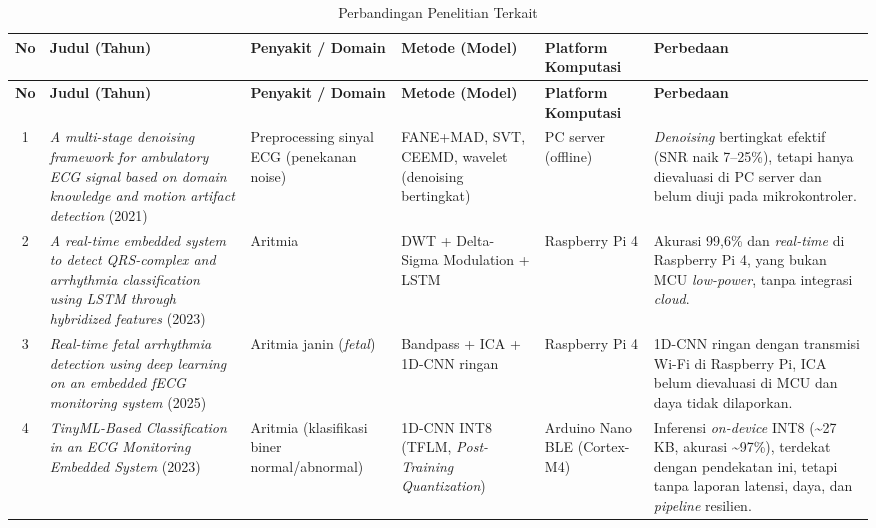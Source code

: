 {\scriptsize
\setlength{\tabcolsep}{3pt}
\renewcommand{\arraystretch}{1.2}
\begin{longtable}{|c|L{3.5cm}|L{2.0cm}|L{2.0cm}|L{1.8cm}|L{2.8cm}|}
\caption{Perbandingan Penelitian Terkait}\label{tab:perbandingan-penelitian}\\
\hline
\textbf{No} & \textbf{Judul (Tahun)} & \textbf{Penyakit / Domain} & \textbf{Metode (Model)} & \textbf{Platform Komputasi} & \textbf{Perbedaan} \\ \hline
\endfirsthead
\hline
\textbf{No} & \textbf{Judul (Tahun)} & \textbf{Penyakit / Domain} & \textbf{Metode (Model)} & \textbf{Platform Komputasi} & \textbf{Perbedaan} \\ \hline
\endhead
\endfoot
\endlastfoot

1 & \textit{A multi-stage denoising framework for ambulatory ECG signal based on domain knowledge and motion artifact detection} (2021) & Preprocessing sinyal ECG (penekanan noise) & FANE+MAD, SVT, CEEMD, wavelet (denoising bertingkat) & PC server (offline) & \textit{Denoising} bertingkat efektif (SNR naik 7--25\%), tetapi hanya dievaluasi di PC server dan belum diuji pada mikrokontroler. \\ \hline

2 & \textit{A real-time embedded system to detect QRS-complex and arrhythmia classification using LSTM through hybridized features} (2023) & Aritmia & DWT + Delta-Sigma Modulation + LSTM & Raspberry Pi 4 & Akurasi 99,6\% dan \textit{real-time} di Raspberry Pi 4, yang bukan MCU \textit{low-power}, tanpa integrasi \textit{cloud}. \\ \hline

3 & \textit{Real-time fetal arrhythmia detection using deep learning on an embedded fECG monitoring system} (2025) & Aritmia janin (\textit{fetal}) & Bandpass + ICA + 1D-CNN ringan & Raspberry Pi 4 & 1D-CNN ringan dengan transmisi Wi-Fi di Raspberry Pi, ICA belum dievaluasi di MCU dan daya tidak dilaporkan. \\ \hline

4 & \textit{TinyML-Based Classification in an ECG Monitoring Embedded System} (2023) & Aritmia (klasifikasi biner normal/\allowbreak abnormal) & 1D-CNN INT8 (TFLM, \textit{Post-Training Quantization}) & Arduino Nano BLE (Cortex-M4) & Inferensi \textit{on-device} INT8 (\textasciitilde27 KB, akurasi \textasciitilde97\%), terdekat dengan pendekatan ini, tetapi tanpa laporan latensi, daya, dan \textit{pipeline} resilien. \\ \hline


\end{longtable}}
